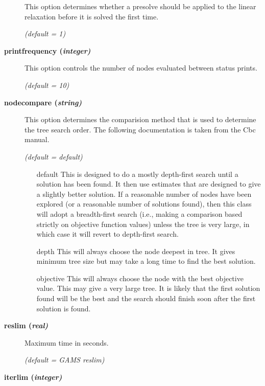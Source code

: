\begin{description}
This option determines whether a presolve should be applied to the linear relaxation before it is solved the first time.

\textsl{(default = 1)}

\item[\label{printfrequency}\hypertarget{printfrequency}
{\textbf{printfrequency (\slshape{integer})}}]\hspace{1.0in}

This option controls the number of nodes evaluated between status prints.

\textsl{(default = 10)}

\item[\label{nodecompare}\hypertarget{nodecompare}
{\textbf{nodecompare (\slshape{string})}}]\hspace{1.0in}

This option determines the comparision method that is used to determine the tree search order.
The following documentation is taken from the Cbc manual.

\textsl{(default = default)}
\begin{itemize}
\item[default] 
This is designed to do a mostly depth-first search until a solution has been found.
It then use estimates that are designed to give a slightly better solution.
If a reasonable number of nodes have been explored (or a reasonable number of solutions found),
then this class will adopt a breadth-first search (i.e., making a comparison based strictly on objective function values) unless the tree is very large, in which case it will revert to depth-first search.
\item[depth] 
This will always choose the node deepest in tree.
It gives minimum tree size but may take a long time to find the best solution.
\item[objective] 
This will always choose the node with the best objective value.
This may give a very large tree.
It is likely that the first solution found will be the best and the search should finish soon after the first solution is found.
\end{itemize}

\item[\label{reslim}\hypertarget{reslim}
{\textbf{reslim (\slshape{real})}}]\hspace{1.0in}

Maximum time in seconds.

\textsl{(default = GAMS reslim)}

\item[\label{iterlim}\hypertarget{iterlim}
{\textbf{iterlim (\slshape{integer})}}]\hspace{1.0in}


\end{description}
